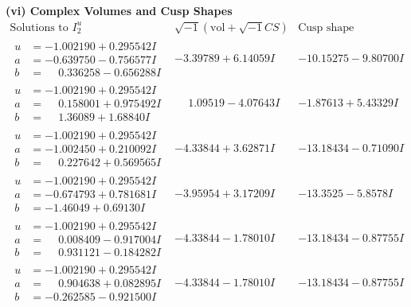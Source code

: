 \documentclass[1p]{elsarticle_modified}
\theoremstyle{definition}
\newcommand{\I}{\sqrt{-1}}
\begin{document}
\newpage\flushleft \textbf{(vi) Complex Volumes and Cusp Shapes}
$$\begin{array}{c|c|c}  
\text{Solutions to }I^u_{2}& \I (\text{vol} + \sqrt{-1}CS) & \text{Cusp shape}\\
 \hline 
\begin{aligned}
u &= -1.002190 + 0.295542 I \\
a &= -0.639750 - 0.756577 I \\
b &= \phantom{-}0.336258 - 0.656288 I\end{aligned}
 & -3.39789 + 6.14059 I & -10.15275 - 9.80700 I \\ \hline\begin{aligned}
u &= -1.002190 + 0.295542 I \\
a &= \phantom{-}0.158001 + 0.975492 I \\
b &= \phantom{-}1.36089 + 1.68840 I\end{aligned}
 & \phantom{-}1.09519 - 4.07643 I & -1.87613 + 5.43329 I \\ \hline\begin{aligned}
u &= -1.002190 + 0.295542 I \\
a &= -1.002450 + 0.210092 I \\
b &= \phantom{-}0.227642 + 0.569565 I\end{aligned}
 & -4.33844 + 3.62871 I & -13.18434 - 0.71090 I \\ \hline\begin{aligned}
u &= -1.002190 + 0.295542 I \\
a &= -0.674793 + 0.781681 I \\
b &= -1.46049 + 0.69130 I\end{aligned}
 & -3.95954 + 3.17209 I & -13.3525 - 5.8578 I \\ \hline\begin{aligned}
u &= -1.002190 + 0.295542 I \\
a &= \phantom{-}0.008409 - 0.917004 I \\
b &= \phantom{-}0.931121 - 0.184282 I\end{aligned}
 & -4.33844 - 1.78010 I & -13.18434 - 0.87755 I \\ \hline\begin{aligned}
u &= -1.002190 + 0.295542 I \\
a &= \phantom{-}0.904638 + 0.082895 I \\
b &= -0.262585 - 0.921500 I\end{aligned}
 & -4.33844 - 1.78010 I & -13.18434 - 0.87755 I \\ \hline\begin{aligned}

\end{aligned}
\end{array}$$
\end{document}
